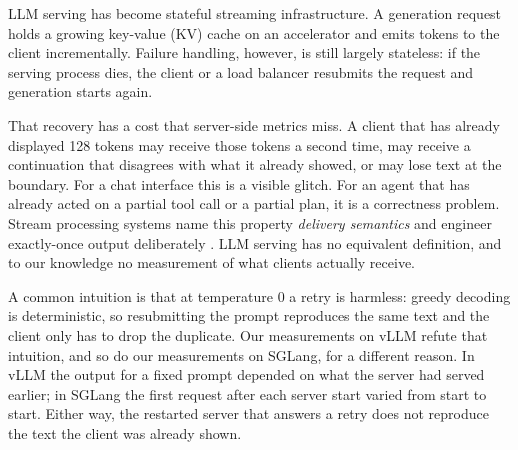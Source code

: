 \documentclass[10pt,twocolumn]{article}
\begin{document}
LLM serving has become stateful streaming infrastructure. A generation request
holds a growing key-value (KV) cache on an accelerator and emits tokens to the
client incrementally. Failure handling, however, is still largely stateless:
if the serving process dies, the client or a load balancer resubmits the
request and generation starts again.

That recovery has a cost that server-side metrics miss. A client that has
already displayed 128 tokens may receive those tokens a second time, may
receive a continuation that disagrees with what it already showed, or may lose
text at the boundary. For a chat interface this is a visible glitch. For an
agent that has already acted on a partial tool call or a partial plan, it is a
correctness problem. Stream processing systems name this property
\emph{delivery semantics} and engineer exactly-once output deliberately
\cite{elnozahy2002survey,carbone2015lightweight,armbrust2018structured}. LLM
serving has no equivalent definition, and to our knowledge no measurement of
what clients actually receive.

A common intuition is that at temperature 0 a retry is harmless: greedy
decoding is deterministic, so resubmitting the prompt reproduces the same
text and the client only has to drop the duplicate. Our measurements on vLLM
refute that intuition, and so do our measurements on SGLang, for a
different reason. In vLLM the output for a fixed prompt depended on what the
server had served earlier; in SGLang the first request after each server
start varied from start to start. Either way, the restarted server that
answers a retry does not reproduce the text the client was already shown.
\end{document}
